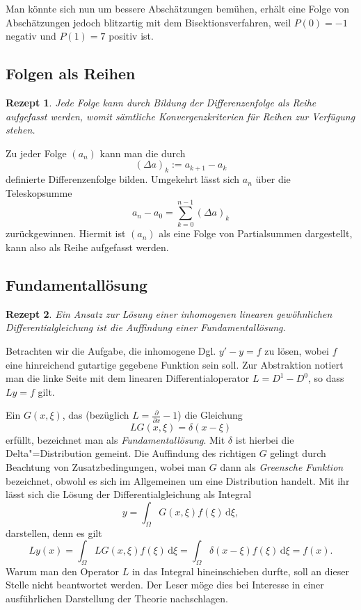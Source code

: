 \documentclass[a4paper,10pt,fleqn,twocolumn,twoside,dvipdfmx]{scrartcl}
\theoremstyle{rmbox}
\newtheorem{Rezept}{Rezept}[section]
\begin{document}
Man könnte sich nun um bessere Abschätzungen bemühen, erhält eine
Folge von Abschätzungen jedoch blitzartig mit dem Bisektionsverfahren,
weil $P(0)=-1$ negativ und $P(1)=7$ positiv ist.

\subsection{Folgen als Reihen}

\begin{Rezept}
Jede Folge kann durch Bildung der Differenzenfolge als Reihe
aufgefasst werden, womit sämtliche Konvergenzkriterien für Reihen
zur Verfügung stehen.
\end{Rezept}

\noindent
Zu jeder Folge $(a_n)$ kann man die durch
\[(\Delta a)_k := a_{k+1} - a_k\]
definierte Differenzenfolge bilden. Umgekehrt lässt sich $a_n$ über
die Teleskopsumme
\[a_n-a_0 = \sum_{k=0}^{n-1} (\Delta a)_k\]
zurückgewinnen. Hiermit ist $(a_n)$ als eine Folge von
Partialsummen dargestellt, kann also als Reihe aufgefasst werden.

\newpage
\subsection{Fundamentallösung}

\begin{Rezept}
Ein Ansatz zur Lösung einer inhomogenen linearen gewöhnlichen
Differentialgleichung ist die Auffindung einer Fundamentallösung.
\end{Rezept}

\noindent
Betrachten wir die Aufgabe, die inhomogene Dgl. $y' - y = f$ zu lösen,
wobei $f$ eine hinreichend gutartige gegebene Funktion sein soll.
Zur Abstraktion notiert man die linke Seite mit dem linearen
Differentialoperator $L=D^1-D^0$, so dass $Ly = f$ gilt.

Ein $G(x,\xi)$, das (bezüglich $L=\frac{\partial}{\partial x}-1$) die
Gleichung
\[LG(x,\xi) = \delta(x-\xi)\]
erfüllt, bezeichnet man als \emph{Fundamentallösung}. Mit $\delta$ ist
hierbei die Delta"=Distribution gemeint. Die Auffindung des richtigen
$G$ gelingt durch Beachtung von Zusatzbedingungen, wobei man $G$ dann
als \emph{Greensche Funktion} bezeichnet, obwohl es sich im Allgemeinen
um eine Distribution handelt. Mit ihr lässt sich die
Lösung der Differentialgleichung als Integral
\[y = \int_\Omega G(x,\xi)f(\xi)\,\mathrm d\xi,\]
darstellen, denn es gilt
\[Ly(x) =\! \int_\Omega\! LG(x,\xi)f(\xi)\,\mathrm d\xi
=\! \int_\Omega\! \delta(x-\xi)f(\xi)\,\mathrm d\xi = f(x).\]
Warum man den Operator $L$ in das Integral hineinschieben durfte, soll an
dieser Stelle nicht beantwortet werden. Der Leser möge dies bei
Interesse in einer ausführlichen Darstellung der Theorie nachschlagen.
\end{document}
